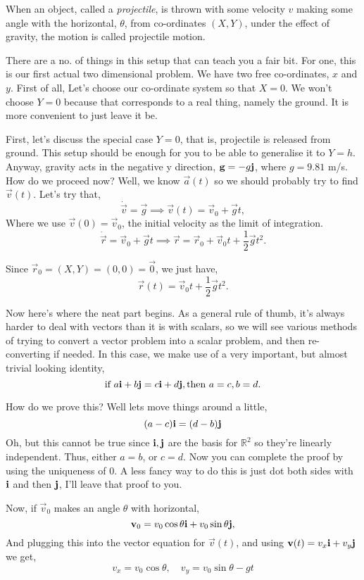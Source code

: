    When an object, called a \textit{projectile}, is thrown with some velocity $v$ 
    making some angle with the horizontal, $\theta$, from co-ordinates $(X, Y)$,
    under the effect of gravity, the motion is called projectile motion.

    There are a no. of things in this setup that can teach you a fair bit. For one,
    this is our first actual two dimensional problem. We have two free co-ordinates,
    $x$ and $y$. First of all, Let's choose our co-ordinate system so that $X = 0$. 
    We won't choose $Y = 0$ because that corresponds to a real thing, namely the ground.
    It is more convenient to just leave it be.

    First, let's discuss the special case $Y = 0$, that is, projectile is released from
    ground. This setup should be enough for you to be able to generalise it to $Y = h$.
    Anyway, gravity acts in the negative y direction, $\mathbf{\boldsymbol{g}} = -g \mathbf{\boldsymbol{j}}$, where $g = 9.81$ m/s. How do we proceed now? Well, we know $\vec{a}(t)$ so we should probably try to find $\vec{v}(t)$. Let's try that,
    $$
    \dot{\vec{v}} = \vec{g} \implies \vec{v}(t) = \vec{v}_0 +\vec{g}t,
    $$
    Where we use $\vec{v}(0) = \vec{v}_0$, the initial velocity as the limit of integration.
    $$
    \dot{\vec{r}} = \vec{v}_0 + \vec{g}t \implies \vec{r} = \vec{r}_0 + \vec{v}_0t + \frac{1}{2} \vec{g}t^2.
    $$
    
    Since $\vec{r}_0 = (X, Y) = (0, 0) = \vec{0}$, we just have,
    $$
    \vec{r}(t) = \vec{v}_0t + \frac{1}{2} \vec{g}t^2.
    $$

    Now here's where the neat part begins. As a general rule of thumb, it's always
    harder to deal with vectors than it is with scalars, so we will see various
    methods of trying to convert a vector problem into a scalar problem, and then
    re-converting if needed. In this case, we make use of a very important, but almost
    trivial looking identity,
    $$\text{if } a\mathbf{\boldsymbol{i}} + b\mathbf{\boldsymbol{j}} = c\mathbf{\boldsymbol{i}} + d\mathbf{\boldsymbol{j}}, \text{then } a = c, b = d.$$

    How do we prove this? Well lets move things around a little, 
    $$
    (a-c)\mathbf{\boldsymbol{i}} = (d-b)\mathbf{\boldsymbol{j}}
    $$
    Oh, but this cannot be true since $\mathbf{\boldsymbol{i}}, \mathbf{\boldsymbol{j}}$ are the basis for $\mathbb{R}^2$ so they're linearly independent. 
    Thus, either $a = b$, or $c = d$. Now you can complete the proof by using the uniqueness of $0$. 
    A less fancy way to do this is just 
    dot both sides with $\mathbf{\boldsymbol{i}}$ and then $\mathbf{\boldsymbol{j}}$, I'll leave that proof to you.

    Now, if $\vec{v}_0$ makes an angle $\theta$ with horizontal, 
    $$
    \mathbf{\boldsymbol{v}}_0 = v_0\cos\theta \mathbf{\boldsymbol{i}} + v_0\sin\theta \mathbf{\boldsymbol{j}},
    $$
    And plugging this into the vector equation for $\vec{v}(t)$, and using $\mathbf{\boldsymbol{v}}(t) = v_x \mathbf{\boldsymbol{i}} + v_y \mathbf{\boldsymbol{j}}$ we get,
    \begin{equation}
        v_x = v_0\cos\theta, \quad v_y = v_0\sin\theta - gt        
    \end{equation}    

